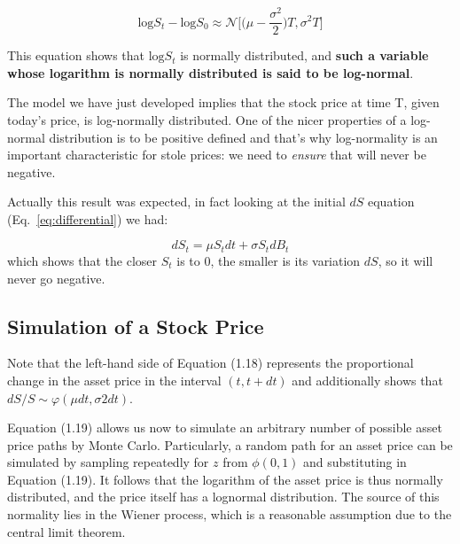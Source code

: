 \begin{equation}
\textrm{log}S_t - \textrm{log}S_0 \approx\mathcal{N}\big[\big(\mu-\frac{\sigma^2}{2}\big)T, \sigma^2 T\big]
\end{equation}

This equation shows that \(\textrm{log}S_t\) is normally distributed,
and \textbf{such a variable whose logarithm is normally distributed is said
	to be log-normal}. 

The model we have just developed implies that
the stock price at time T, given today's price, is log-normally
distributed. One of the nicer properties of a log-normal distribution is to be positive defined and that's why log-normality is an important characteristic for stole prices: we need to \emph{ensure} that will never be negative. 

Actually this result was expected, in fact looking at the initial \(dS\) equation (Eq.~\ref{eq:differential}) we had:

\begin{equation}
dS_t = \mu S_tdt + \sigma S_tdB_t
\end{equation}
which shows that the closer \(S_t\) is to 0, the smaller is its variation \(dS\), so it will never go negative.


\subsection{Simulation of a Stock Price}
Note that the left-hand side of Equation (1.18) represents the 
proportional change in the asset price in the interval $(t, t + dt)$ and 
additionally shows that $dS/S ∼ φ(μdt, σ2dt)$. 

Equation (1.19) allows us now to simulate an arbitrary number of possible 
asset price paths by Monte Carlo. Particularly, a random path for an asset 
price can be simulated by sampling repeatedly for $z$ from $\phi(0,1)$ and 
substituting in Equation (1.19). It follows that the logarithm of the asset 
price is thus normally distributed, and the price itself has a lognormal 
distribution. The source of this normality lies in the Wiener
process, which is a reasonable assumption due to the central limit
theorem. 

